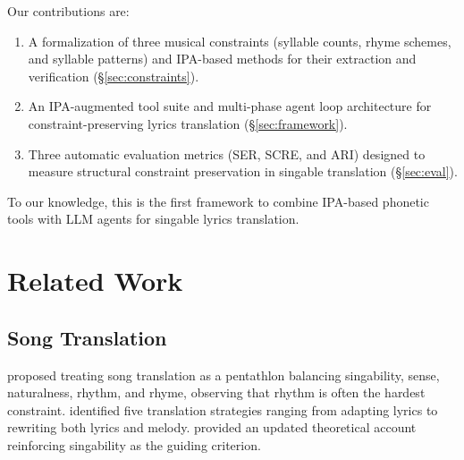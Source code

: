 \documentclass[11pt]{article}
\begin{document}
Our contributions are:
\begin{enumerate}
    \item A formalization of three musical constraints (syllable counts, rhyme schemes, and syllable patterns) and IPA-based methods for their extraction and verification (\S\ref{sec:constraints}).
    \item An IPA-augmented tool suite and multi-phase agent loop architecture for constraint-preserving lyrics translation (\S\ref{sec:framework}).
    \item Three automatic evaluation metrics (SER, SCRE, and ARI) designed to measure structural constraint preservation in singable translation (\S\ref{sec:eval}).
\end{enumerate}
To our knowledge, this is the first framework to combine IPA-based phonetic tools with LLM agents for singable lyrics translation.

\section{Related Work}

\subsection{Song Translation}

\citet{low-2005-pentathlon} proposed treating song translation as a pentathlon balancing singability, sense, naturalness, rhythm, and rhyme, observing that rhythm is often the hardest constraint.
\citet{franzon-2008-choices} identified five translation strategies ranging from adapting lyrics to rewriting both lyrics and melody.
\citet{low-2022-translating} provided an updated theoretical account reinforcing singability as the guiding criterion.
\end{document}
